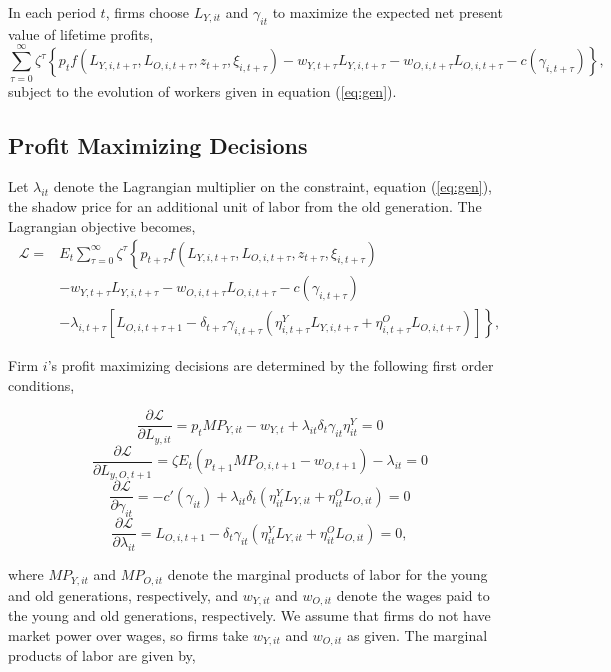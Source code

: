 \documentclass[11pt]{article}
\newcommand{\beq}{\begin{equation}}
\newcommand{\eeq}{\end{equation}}
\newcommand{\ds}{\displaystyle}
\begin{document}
In each period $t$, firms choose $L_{Y,it}$ and $\gamma_{it}$ to maximize the expected net present value of lifetime profits,
\beq \sum_{\tau=0}^{\infty} \zeta^{\tau} \left\{ p_t f\left( L_{Y,i,t+\tau}, L_{O,i,t+\tau}, z_{t+\tau}, \xi_{i,t+\tau} \right) - w_{Y,t+\tau} L_{Y,i,t+\tau} - w_{O,i,t+\tau} L_{O,i,t+\tau} - c(\gamma_{i,t+\tau}) \right\}, \eeq
subject to the evolution of workers given in equation (\ref{eq:gen}).

\subsection{Profit Maximizing Decisions}
  
Let $\lambda_{it}$ denote the Lagrangian multiplier on the constraint, equation (\ref{eq:gen}), the shadow price for an additional unit of labor from the old generation. The Lagrangian objective becomes,
\beq
\begin{array}{ll}
  \ds \mathscr{L} = & \ds E_t \sum_{\tau=0}^{\infty} \zeta^{\tau} \left\{ p_{t+\tau} f\left( L_{Y,i,t+\tau}, L_{O,i,t+\tau}, z_{t+\tau}, \xi_{i,t+\tau} \right) \right. \\ [0.5pc]
  & \ds - w_{Y,t+\tau} L_{Y,i,t+\tau} - w_{O,i,t+\tau} L_{O,i,t+\tau} - c(\gamma_{i,t+\tau}) \\ [0.5pc]
  & \ds \left. - \lambda_{i,t+\tau} \left[ L_{O,i,t+\tau+1} - \delta_{t+\tau} \gamma_{i,t+\tau} \left( \eta^Y_{i,t+\tau} L_{Y,i,t+\tau} +  \eta^O_{i,t+\tau} L_{O,i,t+\tau} \right) \right] \right\},
\end{array}
\eeq

Firm $i$'s profit maximizing decisions are determined by the following first order conditions,

\beq \label{eq:focLY} \frac{\partial \mathscr{L}}{\partial L_{y,it}} = p_t MP_{Y,it} - w_{Y,t} + \lambda_{it} \delta_t \gamma_{it} \eta^Y_{it} = 0 \eeq
\beq \label{eq:focLO} \frac{\partial \mathscr{L}}{\partial L_{y,O,t+1}} = \zeta E_t \left( p_{t+1} MP_{O,i,t+1} - w_{O,t+1} \right) - \lambda_{it} = 0 \eeq
\beq \label{eq:focgamma} \frac{\partial \mathscr{L}}{\partial \gamma_{it}} = -c'(\gamma_{it}) + \lambda_{it} \delta_{t} \left( \eta^Y_{it} L_{Y,it} +  \eta^O_{it} L_{O,it} \right)= 0 \eeq
\beq \label{eq:foclambda} \frac{\partial \mathscr{L}}{\partial \lambda_{it}} = L_{O,i,t+1} - \delta_t \gamma_{it} \left( \eta^Y_{it} L_{Y,it} +  \eta^O_{it} L_{O,it} \right)= 0, \eeq

\noindent where $MP_{Y,it}$ and $MP_{O,it}$ denote the marginal products of labor for the young and old generations, respectively, and $w_{Y,it}$ and $w_{O,it}$ denote the wages paid to the young and old generations, respectively. We assume that firms do not have market power over wages, so firms take $w_{Y,it}$ and $w_{O,it}$ as given. The marginal products of labor are given by,
\end{document}
